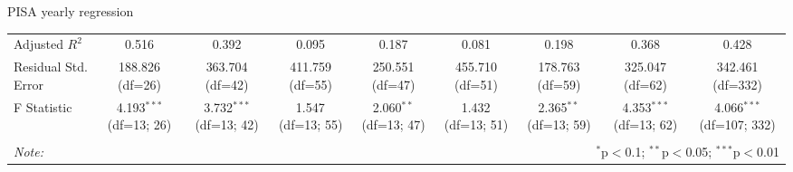 \documentclass[10pt]{beamer}
\begin{document}
\begin{frame}{PISA yearly regression}
\begin{table}[!htbp]
{\begin{tabular}{@{\extracolsep{1pt}}lcccccccc}
                 Adjusted $R^2$ & 0.516 & 0.392 & 0.095 & 0.187 & 0.081 & 0.198 & 0.368 & 0.428 \\
                 Residual Std. Error & 188.826 (df=26) & 363.704 (df=42) & 411.759 (df=55) & 250.551 (df=47) & 455.710 (df=51) & 178.763 (df=59) & 325.047 (df=62) & 342.461 (df=332) \\
                 F Statistic & 4.193$^{***}$ (df=13; 26) & 3.732$^{***}$ (df=13; 42) & 1.547$^{}$ (df=13; 55) & 2.060$^{**}$ (df=13; 47) & 1.432$^{}$ (df=13; 51) & 2.365$^{**}$ (df=13; 59) & 4.353$^{***}$ (df=13; 62) & 4.066$^{***}$ (df=107; 332) \\
                \hline
                \hline \\[-1.8ex]
                \textit{Note:} & \multicolumn{8}{r}{$^{*}$p$<$0.1; $^{**}$p$<$0.05; $^{***}$p$<$0.01} \\
                \end{tabular}
        }
        \end{table}
        
\end{frame}
\end{document}
